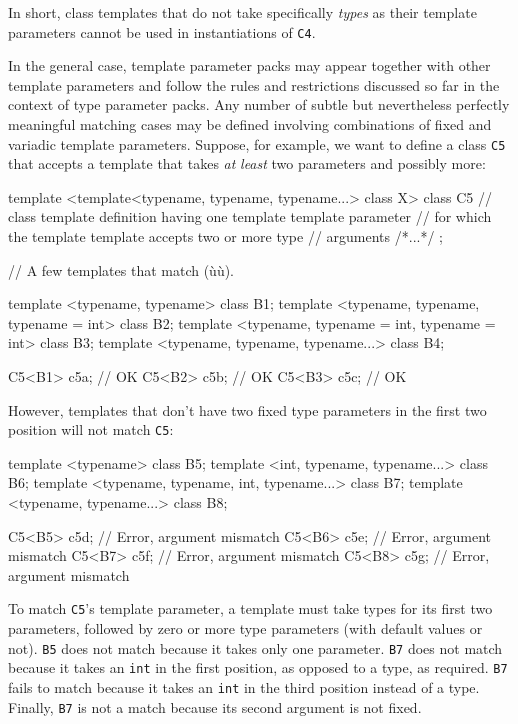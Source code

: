 \noindent In short, class templates that do not take specifically \emph{types} as
their template parameters cannot be used in instantiations of
\lstinline!C4!.

In the general case, template parameter packs may appear together with
other template parameters and follow the rules and restrictions
discussed so far in the context of type parameter packs. Any number of
subtle but nevertheless perfectly meaningful matching cases may be
defined involving combinations of fixed and variadic template
parameters. Suppose, for example, we want to define a class \lstinline!C5!
that accepts a template that takes \emph{at} \emph{least} two parameters
and possibly more:

\begin{emcppslisting}[emcppsbatch=e24]
template <template<typename, typename, typename...> class X>
class C5
    // class template definition having one template template parameter
    // for which the template template accepts two or more type
    // arguments
{ /*...*/ };

// A few templates that match (ù{}ù).

template <typename, typename> class B1;
template <typename, typename, typename = int> class B2;
template <typename, typename = int, typename = int> class B3;
template <typename, typename, typename...> class B4;

C5<B1> c5a;  // OK
C5<B2> c5b;  // OK
C5<B3> c5c;  // OK
\end{emcppslisting}
    

\noindent However, templates that don't have two fixed type parameters in the
first two position will not match \lstinline!C5!:

\begin{emcppslisting}[emcppsbatch=e24]
template <typename> class B5;
template <int, typename, typename...> class B6;
template <typename, typename, int, typename...> class B7;
template <typename, typename...> class B8;

C5<B5> c5d;  // Error, argument mismatch
C5<B6> c5e;  // Error, argument mismatch
C5<B7> c5f;  // Error, argument mismatch
C5<B8> c5g;  // Error, argument mismatch
\end{emcppslisting}
    

\noindent To match \lstinline!C5!'s template parameter, a template must take types
for its first two parameters, followed by zero or more type parameters
(with default values or not). \lstinline!B5! does not match because it
takes only one parameter. \lstinline!B7! does not match because it takes an
\lstinline!int! in the first position, as opposed to a type, as required.
\lstinline!B7! fails to match because it takes an \lstinline!int! in the third
position instead of a type. Finally, \lstinline!B7! is not a match because
its second argument is not fixed.

